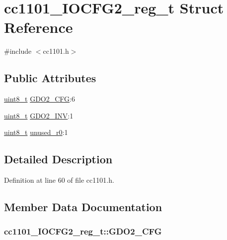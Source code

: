 \hypertarget{structcc1101___i_o_c_f_g2__reg__t}{}\section{cc1101\+\_\+\+I\+O\+C\+F\+G2\+\_\+reg\+\_\+t Struct Reference}
\label{structcc1101___i_o_c_f_g2__reg__t}


{\ttfamily \#include $<$cc1101.\+h$>$}

\subsection*{Public Attributes}
\begin{DoxyCompactItemize}
\item 
\hyperlink{_p_e___types_8h_aba7bc1797add20fe3efdf37ced1182c5}{uint8\+\_\+t} \hyperlink{structcc1101___i_o_c_f_g2__reg__t_af25c2a1d28cb749bf806ccd4252611a4}{G\+D\+O2\+\_\+\+C\+FG}\+:6
\item 
\hyperlink{_p_e___types_8h_aba7bc1797add20fe3efdf37ced1182c5}{uint8\+\_\+t} \hyperlink{structcc1101___i_o_c_f_g2__reg__t_a7f874163213906db39da9b99e8a98b5d}{G\+D\+O2\+\_\+\+I\+NV}\+:1
\item 
\hyperlink{_p_e___types_8h_aba7bc1797add20fe3efdf37ced1182c5}{uint8\+\_\+t} \hyperlink{structcc1101___i_o_c_f_g2__reg__t_a93dd7164de27eca2482ab65afc6d445f}{unused\+\_\+r0}\+:1
\end{DoxyCompactItemize}


\subsection{Detailed Description}


Definition at line 60 of file cc1101.\+h.



\subsection{Member Data Documentation}
\subsubsection[{\texorpdfstring{G\+D\+O2\+\_\+\+C\+FG}{GDO2_CFG}}]{ cc1101\+\_\+\+I\+O\+C\+F\+G2\+\_\+reg\+\_\+t\+::\+G\+D\+O2\+\_\+\+C\+FG}\hypertarget{structcc1101___i_o_c_f_g2__reg__t_af25c2a1d28cb749bf806ccd4252611a4}{}\label{structcc1101___i_o_c_f_g2__reg__t_af25c2a1d28cb749bf806ccd4252611a4}


